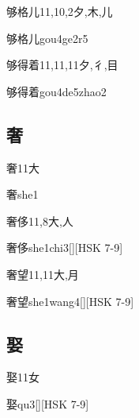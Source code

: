 \begin{Entry}{够格儿}{11,10,2}{⼣,⽊,⼉}
  \begin{Phonetics}{够格儿}{gou4ge2r5}
  \end{Phonetics}
\end{Entry}

\begin{Entry}{够得着}{11,11,11}{⼣,⼻,⽬}
  \begin{Phonetics}{够得着}{gou4de5zhao2}
  \end{Phonetics}
\end{Entry}

\subsection*{奢}

\begin{Entry}{奢}{11}{⼤}
  \begin{Phonetics}{奢}{she1}
  \end{Phonetics}
\end{Entry}

\begin{Entry}{奢侈}{11,8}{⼤,⼈}
  \begin{Phonetics}{奢侈}{she1chi3}[][HSK 7-9]
  \end{Phonetics}
\end{Entry}

\begin{Entry}{奢望}{11,11}{⼤,⽉}
  \begin{Phonetics}{奢望}{she1wang4}[][HSK 7-9]
  \end{Phonetics}
\end{Entry}

\subsection*{娶}

\begin{Entry}{娶}{11}{⼥}
  \begin{Phonetics}{娶}{qu3}[][HSK 7-9]
  \end{Phonetics}
\end{Entry}

